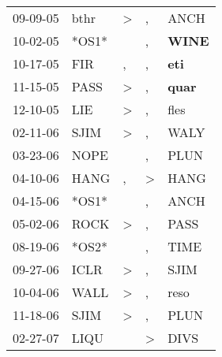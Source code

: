 \begin{supertabular}{p{0.07\textwidth}p{0.06\textwidth}p{0.02\textwidth}p{0.02\textwidth}p{0.06\textwidth}}
          09-09-05\textsuperscript{} &           bthr\textsuperscript{} &     \textgreater &             , &           ANCH\textsuperscript{} \\
          10-02-05\textsuperscript{} &                            *OS1* &                  &             , &  \textbf{WINE\textsuperscript{}} \\
          10-17-05\textsuperscript{} &            FIR\textsuperscript{} &                , &             , &   \textbf{eti\textsuperscript{}} \\
          11-15-05\textsuperscript{} &           PASS\textsuperscript{} &     \textgreater &             , &  \textbf{quar\textsuperscript{}} \\
          12-10-05\textsuperscript{} &            LIE\textsuperscript{} &     \textgreater &             , &           fles\textsuperscript{} \\
          02-11-06\textsuperscript{} &           SJIM\textsuperscript{} &     \textgreater &             , &           WALY\textsuperscript{} \\
          03-23-06\textsuperscript{} &           NOPE\textsuperscript{} &                  &             , &           PLUN\textsuperscript{} \\
          04-10-06\textsuperscript{} &           HANG\textsuperscript{} &                , &  \textgreater &           HANG\textsuperscript{} \\
          04-15-06\textsuperscript{} &                            *OS1* &                  &             , &           ANCH\textsuperscript{} \\
          05-02-06\textsuperscript{} &           ROCK\textsuperscript{} &     \textgreater &             , &           PASS\textsuperscript{} \\
          08-19-06\textsuperscript{} &                            *OS2* &                  &             , &           TIME\textsuperscript{} \\
          09-27-06\textsuperscript{} &           ICLR\textsuperscript{} &     \textgreater &             , &           SJIM\textsuperscript{} \\
          10-04-06\textsuperscript{} &           WALL\textsuperscript{} &     \textgreater &             , &           reso\textsuperscript{} \\
          11-18-06\textsuperscript{} &           SJIM\textsuperscript{} &     \textgreater &             , &           PLUN\textsuperscript{} \\
          02-27-07\textsuperscript{} &           LIQU\textsuperscript{} &                  &  \textgreater &           DIVS\textsuperscript{} \\

\end{supertabular}

